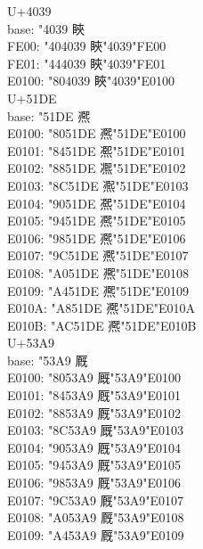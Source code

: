 \documentclass{ujarticle}
\begin{document}
\begin{multicols*}{4}
\newcolumn
U+4039\\
base: \kchar"4039 䀹\\
FE00: \kchar"404039 䀹︀\kchar"4039\kchar"FE00\\
FE01: \kchar"444039 䀹︁\kchar"4039\kchar"FE01\\
E0100: \kchar"804039 䀹󠄀\kchar"4039\kchar"E0100\\
\VS
U+51DE\\
base: \kchar"51DE 凞\\
E0100: \kchar"8051DE 凞󠄀\kchar"51DE\kchar"E0100\\
E0101: \kchar"8451DE 凞󠄁\kchar"51DE\kchar"E0101\\
E0102: \kchar"8851DE 凞󠄂\kchar"51DE\kchar"E0102\\
E0103: \kchar"8C51DE 凞󠄃\kchar"51DE\kchar"E0103\\
E0104: \kchar"9051DE 凞󠄄\kchar"51DE\kchar"E0104\\
E0105: \kchar"9451DE 凞󠄅\kchar"51DE\kchar"E0105\\
E0106: \kchar"9851DE 凞󠄆\kchar"51DE\kchar"E0106\\
E0107: \kchar"9C51DE 凞󠄇\kchar"51DE\kchar"E0107\\
E0108: \kchar"A051DE 凞󠄈\kchar"51DE\kchar"E0108\\
E0109: \kchar"A451DE 凞󠄉\kchar"51DE\kchar"E0109\\
E010A: \kchar"A851DE 凞󠄊\kchar"51DE\kchar"E010A\\
E010B: \kchar"AC51DE 凞󠄋\kchar"51DE\kchar"E010B\\
\VS
U+53A9\\
base: \kchar"53A9 厩\\
E0100: \kchar"8053A9 厩󠄀\kchar"53A9\kchar"E0100\\
E0101: \kchar"8453A9 厩󠄁\kchar"53A9\kchar"E0101\\
E0102: \kchar"8853A9 厩󠄂\kchar"53A9\kchar"E0102\\
E0103: \kchar"8C53A9 厩󠄃\kchar"53A9\kchar"E0103\\
E0104: \kchar"9053A9 厩󠄄\kchar"53A9\kchar"E0104\\
E0105: \kchar"9453A9 厩󠄅\kchar"53A9\kchar"E0105\\
E0106: \kchar"9853A9 厩󠄆\kchar"53A9\kchar"E0106\\
E0107: \kchar"9C53A9 厩󠄇\kchar"53A9\kchar"E0107\\
E0108: \kchar"A053A9 厩󠄈\kchar"53A9\kchar"E0108\\
E0109: \kchar"A453A9 厩󠄉\kchar"53A9\kchar"E0109\\

\end{multicols*}
\end{document}
